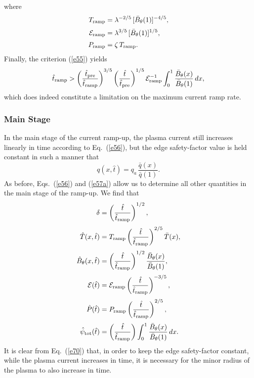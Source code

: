 \documentclass[12pt,prb,aps]{revtex4-1}
\begin{document}
where
\begin{align}
T_{\rm ramp}&= \lambda^{-2/5}\,[\bar{B}_\theta(1)]^{-4/5},\\[0.5ex]
{\cal E}_{\rm ramp} &= \lambda^{3/5}\,[\bar{B}_\theta(1)]^{1/5},\\[0.5ex]
P_{\rm ramp} &= \zeta\,T_{\rm ramp}.
\end{align}
Finally, the criterion (\ref{e55}) yields
\begin{equation}\label{e55d}
\hat{t}_{\rm ramp} > \left(\frac{\hat{t}_{\rm pre}}{\hat{t}_{\rm ramp}}\right)^{3/5}\left(\frac{\hat{t}}{\hat{t}_{\rm pre}}\right)^{1/5}{\cal E}_{\rm ramp}^{-1}\int_0^1\frac{\bar{B}_{\theta}(x)}{\bar{B}_\theta(1)}\,dx,
\end{equation}
which does indeed constitute a limitation on the maximum current ramp rate.

\subsubsection{Main Stage}\label{main}
In the main stage of the current ramp-up, the plasma current still increases linearly in time according to Eq.~(\ref{e56}), but the edge safety-factor value
is held constant in such a manner that 
\begin{equation}\label{e57a}
q(x,\hat{t}) = q_a\,\frac{\bar{q}(x)}{\bar{q}(1)}.
\end{equation}
As before, Eqs.~(\ref{e56}) and (\ref{e57a}) allow us to determine all other quantities in the main 
stage of the ramp-up. We find that 
\begin{align}
\delta &= \left(\frac{\hat{t}}{\hat{t}_{\rm ramp}}\right)^{1/2},\label{e70}\\[0.5ex]
\hat{T}(x,\hat{t}) &= T_{\rm ramp}\left(\frac{\hat{t}}{\hat{t}_{\rm ramp}}\right)^{2/5}\bar{T}(x),\\[0.5ex]
\hat{B}_\theta(x,\hat{t})&= \left(\frac{\hat{t}}{\hat{t}_{\rm ramp}}\right)^{1/2}\frac{\bar{B}_\theta(x)}{\bar{B}_\theta(1)},\\[0.5ex]
{\cal E}(\hat{t}) &= {\cal E}_{\rm ramp}\left(\frac{\hat{t}}{\hat{t}_{\rm ramp}}\right)^{-3/5},\\[0.5ex]
\hat{P}(\hat{t}) &= P_{\rm ramp}\left(\frac{\hat{t}}{\hat{t}_{\rm ramp}}\right)^{2/5},\\[0.5ex]
\hat{\psi}_{\rm tot}(\hat{t})&= \left(\frac{\hat{t}}{\hat{t}_{\rm ramp}}\right)\int_0^1\frac{\bar{B}_{\theta}(x)}{\bar{B}_\theta(1)}\,dx.
\end{align}
It is clear from Eq.~(\ref{e70}) that, in order to keep the edge safety-factor constant, while the plasma current increases in time, it
is necessary for the minor radius of the plasma to also increase in time. 
\end{document}
